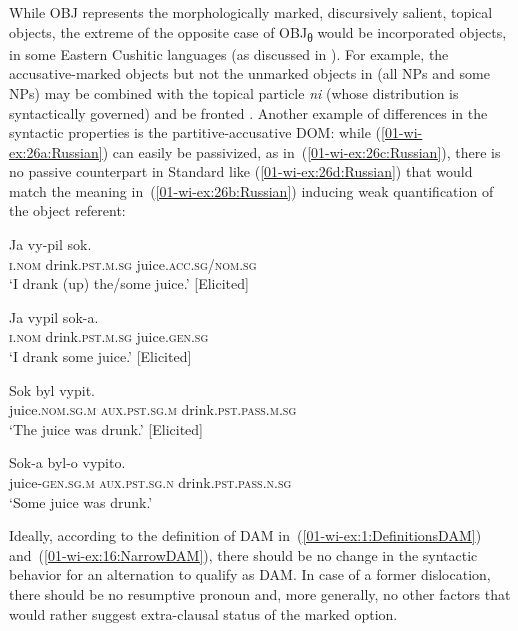 \documentclass[output=paper]{LSP/langsci}
\begin{document}
\noindent While OBJ represents the morphologically marked, discursively salient, topical objects, the extreme of the opposite case of OBJ\textsubscript{θ} would be incorporated objects, \eg in some Eastern Cushitic languages (as discussed in \citealt{Sasse1984Case}).
For example, the accusative-marked objects but not the unmarked objects in  (all  NPs and some  NPs) may be combined with the topical particle \textit{ni} (whose distribution is syntactically governed) and be fronted \citep[153–154]{Dalrympleetal2011Objects}.
Another example of differences in the syntactic properties is the  partitive-accusative DOM: while (\ref{01-wi-ex:26a:Russian}) can easily be passivized, as in~(\ref{01-wi-ex:26c:Russian}), there is no passive counterpart in Standard  like (\ref{01-wi-ex:26d:Russian}) that would match the meaning in~(\ref{01-wi-ex:26b:Russian}) inducing weak quantification of the object referent:

\ea\label{01-wi-ex:26:Russian}
\begin{xlist}

\ex\label{01-wi-ex:26a:Russian}
	\gll Ja	vy-pil 			sok.\\
	\textsc{i.nom}	drink.\textsc{pst.m.sg}	juice.\textsc{acc.sg}/\textsc{nom.sg}\\
	\glt ‘I drank (up) the/some juice.’ [Elicited]

\ex\label{01-wi-ex:26b:Russian}
	\gll Ja	vypil			sok-a.\\
	\textsc{i.nom}	drink.\textsc{pst.m.sg}	juice.\textsc{gen.sg}\\
	\glt ‘I drank some juice.’ [Elicited]

\ex\label{01-wi-ex:26c:Russian}
	\gll Sok 			byl 		vypit.\\
	juice.\textsc{nom.sg.m} 	\textsc{aux.pst.sg.m}	drink.\textsc{pst.pass.m.sg}\\	
	\glt ‘The juice was drunk.’ [Elicited]

\ex\label{01-wi-ex:26d:Russian}
	\gll *Sok-a			byl-o 		vypito.\\
	juice-\textsc{gen.sg.m} 	\textsc{aux.pst.sg.n}	drink.\textsc{pst.pass.n.sg}\\	
	 ‘Some juice was drunk.’
\end{xlist}
\z

Ideally, according to the definition of DAM in~(\ref{01-wi-ex:1:DefinitionsDAM}) and~(\ref{01-wi-ex:16:NarrowDAM}), there should be no change in the syntactic behavior for an alternation to qualify as DAM. 
In case of a former dislocation, there should be no resumptive pronoun and, more generally, no other factors that would rather suggest extra-clausal status of the marked option.
\end{document}

